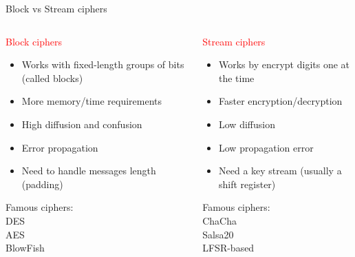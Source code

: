 \begin{frame}{Block vs Stream ciphers}

  \begin{columns}
  \begin{column}{0.5\textwidth}
    \textcolor{red}{Block ciphers}
    
    \begin{itemize}
      \item Works with fixed-length groups of bits (called blocks)
      \item More memory/time requirements
      \item High diffusion and confusion
      \item Error propagation
      \item Need to handle messages length (padding)
    \end{itemize}

    Famous ciphers:       \\
    \phantom{pad}DES      \\
    \phantom{pad}AES      \\
    \phantom{pad}BlowFish
  \end{column}
  \begin{column}{0.5\textwidth}
    \textcolor{red}{Stream ciphers}
    
    \begin{itemize}
      \item Works by encrypt digits one at the time
      \item Faster encryption/decryption
      \item Low diffusion
      \item Low propagation error
      \item Need a key stream (usually a shift register)
    \end{itemize}

    Famous ciphers:         \\
    \phantom{pad}ChaCha     \\
    \phantom{pad}Salsa20    \\
    \phantom{pad}LFSR-based
    
  \end{column}
  \end{columns}

\end{frame}

